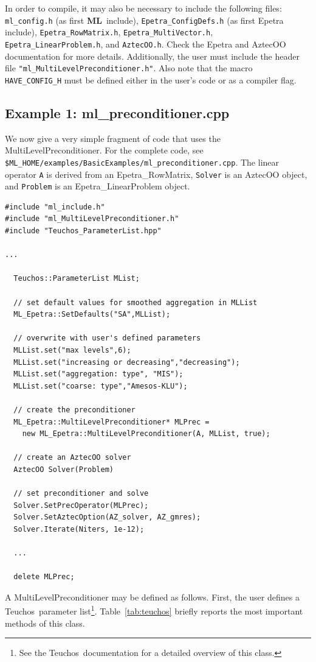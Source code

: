 \documentclass{article}[11pt]
\newcommand{\ML}     {{\bf ML}}
\newcommand{\teuchos}  {{\sc Teuchos}}
\begin{document}
  In order to compile, it may also be necessary to include the following
  files: \verb!ml_config.h! (as first \ML\ include),
  \verb!Epetra_ConfigDefs.h! (as first {\sc Epetra} include),
  \verb!Epetra_RowMatrix.h!, \newline \verb!Epetra_MultiVector.h!,
  \verb!Epetra_LinearProblem.h!, and \verb!AztecOO.h!. Check the {\sc
    Epetra} and {\sc AztecOO} documentation for more details.
  Additionally, the user must include the header file
  \verb!"ml_MultiLevelPreconditioner.h"!.  Also note that the macro
  \verb!HAVE_CONFIG_H!  must be defined either in the user's code or as
  a compiler flag.

\subsection{Example 1: ml\_preconditioner.cpp}
\label{parameter list ex. 1}

We now give a very simple fragment of code that uses the
MultiLevelPreconditioner.
For the complete code, see
\verb!$ML_HOME/examples/BasicExamples/ml_preconditioner.cpp!.
The linear operator \verb!A! is derived from an
Epetra\_RowMatrix, \verb!Solver! is an AztecOO object, and
\verb!Problem! is an Epetra\_LinearProblem object.

\begin{verbatim}
#include "ml_include.h"
#include "ml_MultiLevelPreconditioner.h"
#include "Teuchos_ParameterList.hpp"

...

  Teuchos::ParameterList MList;

  // set default values for smoothed aggregation in MLList
  ML_Epetra::SetDefaults("SA",MLList);

  // overwrite with user's defined parameters
  MLList.set("max levels",6);
  MLList.set("increasing or decreasing","decreasing");
  MLList.set("aggregation: type", "MIS");
  MLList.set("coarse: type","Amesos-KLU");
  
  // create the preconditioner
  ML_Epetra::MultiLevelPreconditioner* MLPrec = 
    new ML_Epetra::MultiLevelPreconditioner(A, MLList, true);

  // create an AztecOO solver
  AztecOO Solver(Problem)

  // set preconditioner and solve
  Solver.SetPrecOperator(MLPrec);
  Solver.SetAztecOption(AZ_solver, AZ_gmres);
  Solver.Iterate(Niters, 1e-12);

  ...

  delete MLPrec;
\end{verbatim}
A MultiLevelPreconditioner may be defined as follows.
First, the user defines a \teuchos~parameter
list\footnote{See the \teuchos~documentation for a detailed overview of
  this class.}.  Table~\ref{tab:teuchos} briefly reports the most
important methods of this class.
\end{document}
